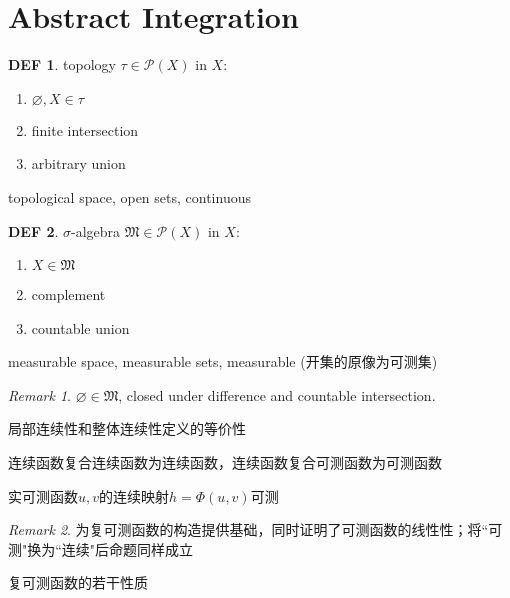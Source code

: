 \documentclass[hidelinks]{article}
\theoremstyle{definition}
\newtheorem*{defin}{DEF}
\theoremstyle{remark}
\newtheorem*{remark}{Remark}
\theoremstyle{plain}
\theoremstyle{dotless}
\newenvironment{proposition}[1]
  {\renewcommand\theinnercustomthm{#1}\innercustomthm}
  {\endinnercustomthm}
\theoremstyle{dotless}
\begin{document}
\section{Abstract Integration}

\begin{defin}
topology $\tau\in \mathcal{P}(X)$ in $X$:\begin{enumerate}
    \item $\varnothing,X\in\tau$
    \item finite intersection
    \item arbitrary union
\end{enumerate}
topological space, open sets, continuous
\end{defin}

\begin{defin}
$\sigma$-algebra $\mathfrak{M}\in \mathcal{P}(X)$ in $X$:\begin{enumerate}
    \item $X\in\mathfrak{M}$
    \item complement
    \item countable union
\end{enumerate}
measurable space, measurable sets, measurable (开集的原像为可测集)
\end{defin}

\begin{remark}
$\varnothing\in\mathfrak{M}$, closed under difference and countable intersection.
\end{remark}

\begin{proposition}{1.5}
局部连续性和整体连续性定义的等价性
\end{proposition}

\begin{proposition}{1.7}
连续函数复合连续函数为连续函数，连续函数复合可测函数为可测函数
\end{proposition}

\begin{proposition}{1.8}
实可测函数$u,v$的连续映射$h=\Phi(u,v)$可测
\end{proposition}

\begin{remark}
为复可测函数的构造提供基础，同时证明了可测函数的线性性；将``可测"换为``连续"后命题同样成立
\end{remark}

\begin{proposition}{1.9}
复可测函数的若干性质
\end{proposition}
\end{document}
